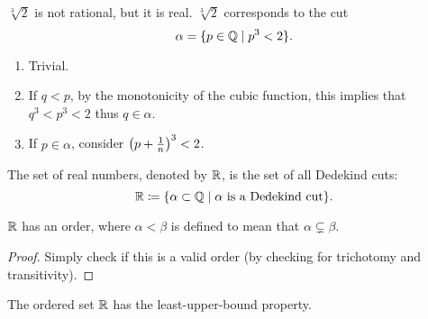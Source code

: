 \begin{example}
$\sqrt[3]{2}$ is not rational, but it is real. $\sqrt[3]{2}$ corresponds to the cut
\[ \alpha=\{p\in\mathbb Q\mid p^3<2\}. \]
\begin{enumerate}[label=(\roman*)]
\item Trivial.
\item If $q<p$, by the monotonicity of the cubic function, this implies that $q^3<p^3<2$ thus $q\in\alpha$.
\item If $p\in\alpha$, consider $\left(p+\frac{1}{n}\right)^3<2$.
\end{enumerate}
\end{example}

\begin{definition}
The set of real numbers, denoted by $\mathbb R$, is the set of all Dedekind cuts:
\[\mathbb R\coloneqq\{\alpha\subset\mathbb Q\mid\alpha\text{ is a Dedekind cut}\}.\]
\end{definition}

\begin{proposition}
$\mathbb R$ has an order, where $\alpha<\beta$ is defined to mean that $\alpha\subsetneq\beta$.
\end{proposition}

\begin{proof}
Simply check if this is a valid order (by checking for trichotomy and transitivity).
\end{proof}

\begin{proposition}
The ordered set $\mathbb R$ has the least-upper-bound property.
\end{proposition}

